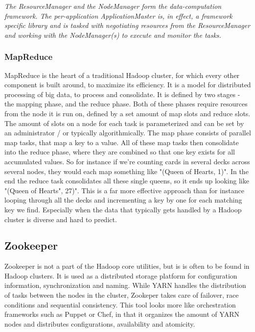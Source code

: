 \documentclass[a4paper,english]{report}
\begin{document}
					\textit{The ResourceManager and the NodeManager form the data-computation framework. The per-application ApplicationMaster is, in effect, a framework specific library and is tasked with negotiating resources from the ResourceManager and working with the NodeManager(s) to execute and monitor the tasks.}\cite{yarn}
				
				\subsubsection{MapReduce}
					MapReduce is the heart of a traditional Hadoop cluster, for which every other component is built around, to maximize its efficiency. It is a model for distributed processing of big data, to process and consolidate. It is defined by two stages - the mapping phase, and the reduce phase. Both of these phases require resources from the node it is run on, defined by a set amount of map slots and reduce slots. The amount of slots on a node for each task is parameterized and can be set by an administrator / or typically algorithmically. The map phase consists of parallel map tasks, that map a key to a value. All of these map tasks then consolidate into the reduce phase, where they are combined so that one key exists for all accumulated values. So for instance if we're counting cards in several decks across several nodes, they would each map something like "(Queen of Hearts, 1)". In the end the reduce task consolidates all these single queens, so it ends up looking like "(Queen of Hearts", 27)". This is a far more effective approach than for instance looping through all the decks and incrementing a key by one for each matching key we find. Especially when the data that typically gets handled by a Hadoop cluster is diverse and hard to predict.
						
			\subsection{Zookeeper}
				Zookeeper is not a part of the Hadoop core utilities, but is is often to be found in Hadoop clusters. It is used as a distributed storage platform for configuration information, synchronization and naming. While YARN handles the distribution of tasks between the nodes in the cluster, Zookeper takes care of failover, race conditions and sequential consistency. This tool looks more like orchestration frameworks such as Puppet or Chef, in that it organizes the amount of YARN nodes and distributes configurations, availability and atomicity.
				
\end{document}
